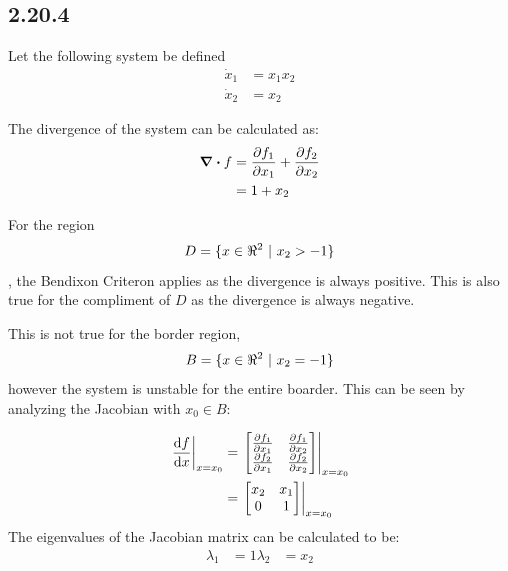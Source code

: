 \documentclass[letter]{article}
\begin{document}
%
%


\newpage
\subsection{2.20.4}
Let the following system be defined
\begin{equation}
	\begin{aligned}
		\dot{x}_1 &= x_1 x_2\\
		\dot{x}_2 &= x_2
	\end{aligned}
\end{equation}

The divergence of the system can be calculated as:
\begin{align}
	\div f  &= \pdv{f_1}{x_1} + \pdv{f_2}{x_2} \nonumber\\
	&= 1 + x_2
\end{align}

For the region $$D = \{x\in \real^2 \ | \ x_2 > -1\}$$, the Bendixon Criteron applies as the divergence is always positive. This is also true for the compliment of $D$ as the divergence is always negative.

This is not true for the border region,
\begin{equation}
	B = \{x \in \real^2 \ | \ x_2 = -1\}
\end{equation}
however the system is unstable for the entire boarder. This can be seen by analyzing the Jacobian with $x_0 \in B$:

\begin{align}
	\eval{\dv{f}{x}}_{x=x_0} 
	&= \eval{\mqty[\pdv{f_1}{x_1} & \pdv{f_1}{x_2}\\
		\pdv{f_2}{x_1} & \pdv{f_2}{x_2}]}_{x=x_0}\\
	&= \eval{\mqty[x_2 & x_1\\ 0 &1]}_{x=x_0}
\end{align}
The eigenvalues of the Jacobian matrix can be calculated to be:
\begin{equation}
	\begin{aligned}
		\lambda_1 &= 1
		\lambda_2 &= x_2
	\end{aligned}
\end{equation}
\end{document}
